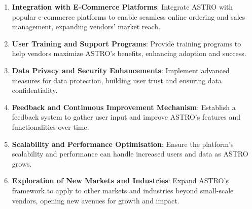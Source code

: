 \begin{enumerate}
    \item \textbf{Integration with E-Commerce Platforms}: Integrate ASTRO with popular e-commerce platforms to enable seamless online ordering and sales management, expanding vendors’ market reach.
    \item \textbf{User Training and Support Programs}: Provide training programs to help vendors maximize ASTRO’s benefits, enhancing adoption and success.
    \item \textbf{Data Privacy and Security Enhancements}: Implement advanced measures for data protection, building user trust and ensuring data confidentiality.
    \item \textbf{Feedback and Continuous Improvement Mechanism}: Establish a feedback system to gather user input and improve ASTRO’s features and functionalities over time.
    \item \textbf{Scalability and Performance Optimisation}: Ensure the platform’s scalability and performance can handle increased users and data as ASTRO grows.
    \item \textbf{Exploration of New Markets and Industries}: Expand ASTRO’s framework to apply to other markets and industries beyond small-scale vendors, opening new avenues for growth and impact.
\end{enumerate}
